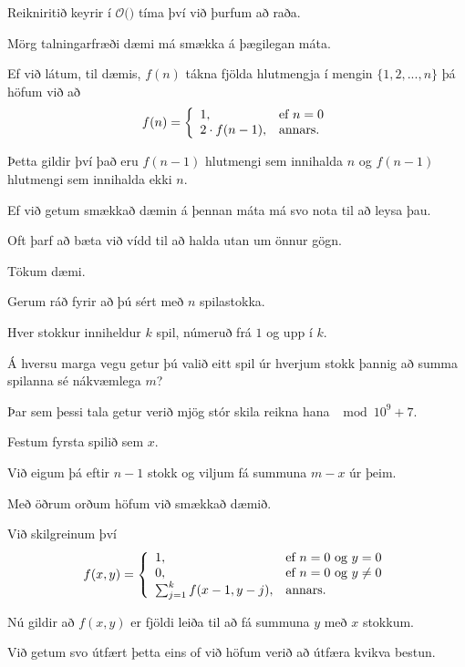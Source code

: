{
}

{
	{
		\item<1-> Reikniritið keyrir í $\mathcal{O}($$)$ tíma því við þurfum að raða.
	}
}

{
	{
		\item<1-> Mörg talningarfræði dæmi má smækka á þægilegan máta.
		\item<2-> Ef við látum, til dæmis, $f(n)$ tákna fjölda hlutmengja í mengin $\{1, 2, ..., n\}$ þá höfum við að
		\[
			f(n) = \left \{
			\env{array}
			{ {l l}
				1, & \text{ef $n = 0$}\\
				2 \cdot f(n - 1), & \text{annars}.
			}
			\right .
		\]
		\item<3-> Þetta gildir því það eru $f(n - 1)$ hlutmengi sem innihalda $n$ og $f(n - 1)$ hlutmengi sem innihalda ekki $n$.
		\item<4-> Ef við getum smækkað dæmin á þennan máta má svo nota  til að leysa þau.
		\item<6-> Oft þarf að bæta við vídd til að halda utan um önnur gögn.
		\item<7-> Tökum dæmi.
	}
}

{
	{
		\item<1-> Gerum ráð fyrir að þú sért með $n$ spilastokka.
		\item<2-> Hver stokkur inniheldur $k$ spil, númeruð frá $1$ og upp í $k$.
		\item<3-> Á hversu marga vegu getur þú valið eitt spil úr hverjum stokk þannig að summa spilanna sé nákvæmlega $m$?
		\item<4-> Þar sem þessi tala getur verið mjög stór skila reikna hana $\mod 10^9 + 7$.
	}
}

{
	{
		\item<1-> Festum fyrsta spilið sem $x$.
		\item<2-> Við eigum þá eftir $n - 1$ stokk og viljum fá summuna $m - x$ úr þeim.
		\item<3-> Með öðrum orðum höfum við smækkað dæmið.
		\item<4-> Við skilgreinum því
		\[
			f(x, y) = \left \{
			\env{array}
			{ {l l}
				1, & \text{ef $n = 0$ og $y = 0$}\\
				0, & \text{ef $n = 0$ og $y \neq 0$}\\
				\sum_{j = 1}^k f(x - 1, y - j), & \text{annars}.
			}
			\right .
		\]
		\item<5-> Nú gildir að $f(x, y)$ er fjöldi leiða til að fá summuna $y$ með $x$ stokkum.
		\item<6-> Við getum svo útfært þetta eins of við höfum verið að útfæra kvikva bestun.
	}
}

